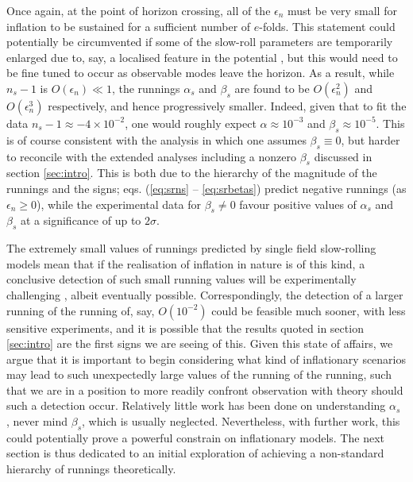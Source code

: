 \documentclass[universe,preprints,oneauthor,pdftex,10pt,a4paper]{mdpi}
\begin{document}
Once again, at the point of horizon crossing, all of the $\epsilon_n$ must be very small for inflation to be sustained for a sufficient number of $e$-folds. This statement could potentially be circumvented if some of the slow-roll parameters are temporarily enlarged due to, say, a localised feature in the potential \cite{Adams:2001vc,Ashoorioon:2014yua}, but this would need to be fine tuned to occur as observable modes leave the horizon. As a result, while $n_s - 1$ is $O(\epsilon_n) \ll 1$, the runnings $\alpha_s$ and $\beta_s$ are found to be $O(\epsilon_n^2)$ and $O(\epsilon_n^3)$ respectively, and hence progressively smaller. Indeed, given that to fit the data $n_s - 1 \approx -4 \times 10^{-2}$, one would roughly expect $\alpha \approx 10^{-3}$ and $\beta_s \approx 10^{-5}$. This is of course consistent with the analysis in which one assumes $\beta_s \equiv 0$, but harder to reconcile with the extended analyses including a nonzero $\beta_s$ discussed in section \ref{sec:intro}. This is both due to the hierarchy of the magnitude of the runnings and the signs; eqs. (\ref{eq:srns} -- \ref{eq:srbetas}) predict negative runnings (as $\epsilon_n \geq 0$), while the experimental data for $\beta_s \neq 0$ favour positive values of $\alpha_s$ and $\beta_s$ at a significance of up to $2 \sigma$.

The extremely small values of runnings predicted by single field slow-rolling models mean that if the realisation of inflation in nature is of this kind, a conclusive detection of such small running values will be experimentally challenging \cite{Munoz:2016owz}, albeit eventually possible. Correspondingly, the detection of a larger running of the running of, say, $O(10^{-2})$ could be feasible much sooner, with less sensitive experiments, and it is possible that the results quoted in section \ref{sec:intro} are the first signs we are seeing of this. Given this state of affairs, we argue that it is important to begin considering what kind of inflationary scenarios may lead to such unexpectedly large values of the running of the running, such that we are in a position to more readily confront observation with theory should such a detection occur. Relatively little work has been done on understanding $\alpha_s$ \cite{Garcia-Bellido:2014gna,Gariazzo:2016blm,Kohri:2014jma,Peloso:2014oza}, never mind $\beta_s$, which is usually neglected. Nevertheless, with further work, this could potentially prove a powerful constrain on inflationary models. The next section is thus dedicated to an initial exploration of achieving a non-standard hierarchy of runnings theoretically.
\end{document}
